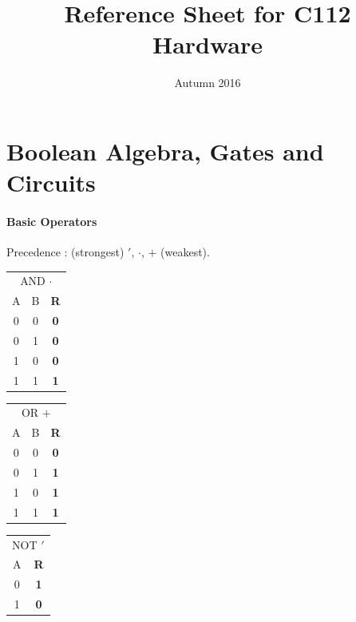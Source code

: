 \documentclass[twocolumn,english]{article}
\providecommand{\tabularnewline}{\\}
\begin{document}
\title{Reference Sheet for C112 Hardware}


\date{Autumn 2016}

\maketitle

\section{Boolean Algebra, Gates and Circuits}


\paragraph{Basic Operators}

Precedence : (strongest) $'$, $\cdot$, $+$ (weakest).

\begin{table}[H]
\noindent \centering{}%
\begin{tabular}{ccc}
\toprule 
\multicolumn{3}{c}{AND $\cdot$}\tabularnewline
A & B & \textbf{R}\tabularnewline
\midrule
0 & 0 & \textbf{0}\tabularnewline
0 & 1 & \textbf{0}\tabularnewline
1 & 0 & \textbf{0}\tabularnewline
1 & 1 & \textbf{1}\tabularnewline
\bottomrule
\end{tabular} %
\begin{tabular}{ccc}
\toprule 
\multicolumn{3}{c}{OR $+$}\tabularnewline
A & B & \textbf{R}\tabularnewline
\midrule
0 & 0 & \textbf{0}\tabularnewline
0 & 1 & \textbf{1}\tabularnewline
1 & 0 & \textbf{1}\tabularnewline
1 & 1 & \textbf{1}\tabularnewline
\bottomrule
\end{tabular} %
\begin{tabular}{cc}
\toprule 
\multicolumn{2}{c}{NOT $'$}\tabularnewline
A & \textbf{R}\tabularnewline
\midrule
0 & \textbf{1}\tabularnewline
1 & \textbf{0}\tabularnewline
\bottomrule
\end{tabular}
\end{table}
\end{document}
